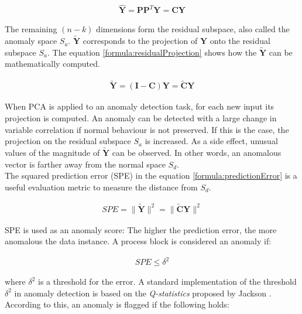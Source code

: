 \begin{gather}
     \mathbf{\hat{Y}} = \mathbf{P}\mathbf{P}^T\mathbf{Y} = \mathbf{CY}
    \label{formula:projection}
\end{gather}

The remaining $(n - k)$ dimensions form the residual subspace, also called the anomaly space $S_a$. $\mathbf{\widetilde{Y}}$ corresponds to the projection of $\mathbf{Y}$ onto the residual subspace $S_a$. The equation \ref{formula:residualProjection} shows how the $\mathbf{\widetilde{Y}}$ can be mathematically computed.  

\begin{gather}
     \mathbf{\widetilde{Y}} = (\mathbf{I - C})\mathbf{Y} = \mathbf{\widetilde{C}Y}
    \label{formula:residualProjection}
\end{gather}
 
When PCA is applied to an anomaly detection task, for each new input its projection is computed. An anomaly can be detected with a large change in variable correlation if normal behaviour is not preserved. If this is the case, the projection on the residual subspace $S_a$ is increased. As a side effect, unusual values of the magnitude of $\mathbf{\widetilde{Y}}$ can be observed. In other words, an anomalous vector is farther away from the normal space $S_d$.\\

The squared prediction error (SPE) in the equation \ref{formula:predictionError} is a useful evaluation metric to measure the distance from $S_d$.
 
 \begin{gather}
     SPE = \parallel \mathbf{\widetilde{Y}} \parallel^2  = \parallel \mathbf{\widetilde{C}Y} \parallel^2
    \label{formula:predictionError}
\end{gather}

SPE is used as an anomaly score: The higher the prediction error, the more anomalous the data instance. A process block is considered an anomaly if:

\begin{gather}
     SPE \leq \delta^2
\end{gather}

where $\delta^2$ is a threshold for the error. A standard implementation of the threshold  $\delta^2$ in anomaly detection is based on the \textit{Q-statistics} proposed by Jackson \cite{pcaJackson1979}. According to this, an anomaly is flagged if the following holds:

